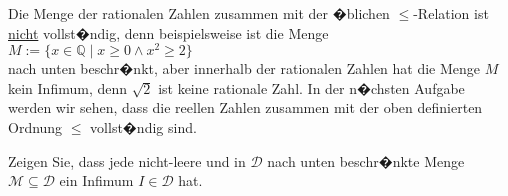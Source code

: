 \remark
Die Menge der rationalen Zahlen zusammen mit der �blichen $\leq$-Relation ist
\underline{nicht} vollst�ndig, denn beispielsweise ist die Menge
\\[0.2cm]
\hspace*{1.3cm}
$M := \{ x \in \mathbb{Q} \mid x \geq 0 \wedge x^2 \geq 2 \}$
\\[0.2cm]
nach unten beschr�nkt, aber innerhalb der rationalen Zahlen hat die Menge $M$ kein Infimum, denn
$\sqrt{2}$ ist keine rationale Zahl.  
In der n�chsten Aufgabe werden wir sehen,  dass die reellen Zahlen zusammen mit
der oben definierten Ordnung $\leq$ vollst�ndig sind.

\exercise
Zeigen Sie, dass jede nicht-leere und in $\mathcal{D}$ nach unten beschr�nkte Menge
$\mathcal{M} \subseteq \mathcal{D}$ ein Infimum $I \in \mathcal{D}$ hat.  \eox


